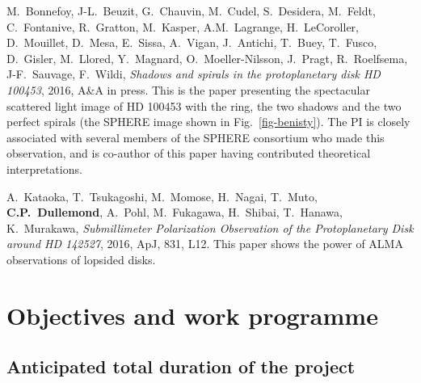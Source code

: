 \documentclass[10pt,fleqn,twoside,a4paper]{article}
\begin{document}
\begin{literature}
  M.~Bonnefoy, J-L.~Beuzit, G.~Chauvin, M.~Cudel, S.~Desidera, M.~Feldt,
  C.~Fontanive, R.~Gratton, M.~Kasper, A.M.~Lagrange, H.~LeCoroller,
  D.~Mouillet, D.~Mesa, E.~Sissa, A.~Vigan, J.~Antichi, T.~Buey, T.~Fusco,
  D.~Gisler, M.~Llored, Y.~Magnard, O.~Moeller-Nilsson, J.~Pragt,
  R.~Roelfsema, J-F.~Sauvage, F.~Wildi, {\em Shadows and spirals in the
    protoplanetary disk HD 100453}, 2016, A\&A in press. This is the paper
  presenting the spectacular scattered light image of HD 100453 with the
  ring, the two shadows and the two perfect spirals (the SPHERE image shown
  in Fig.~\ref{fig-benisty}). The PI is closely associated with several
  members of the SPHERE consortium who made this observation, and is
  co-author of this paper having contributed theoretical interpretations.
\item A.~Kataoka, T.~Tsukagoshi, M.~Momose, H.~Nagai, T.~Muto, {\bf
    C.P.~Dullemond}, A.~Pohl, M.~Fukagawa, H.~Shibai, T.~Hanawa,
  K.~Murakawa, {\em Submillimeter Polarization Observation of the
    Protoplanetary Disk around HD 142527}, 2016, ApJ, 831, L12. This paper
  shows the power of ALMA observations of lopsided disks.
\end{literature}



% 
% 
% 
% 

\section{Objectives and work programme}
\renewcommand{\leftmark}{\sc Objectives and work programme}


\subsection{Anticipated total duration of the project}
\end{document}
